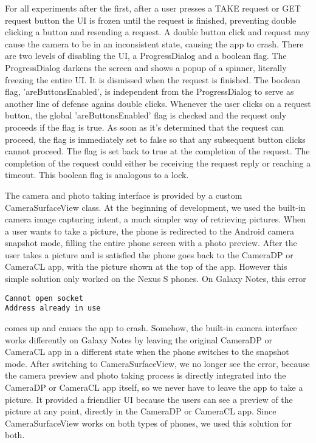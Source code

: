 For all experiments after the first, after a user presses a TAKE request or GET request button the UI is frozen until the request is finished, preventing double clicking a button and resending a request. A double button click and request may cause the camera to be in an inconsistent state, causing the app to crash. There are two levels of disabling the UI, a ProgressDialog and a boolean flag. The ProgressDialog darkens the screen and shows a popup of a spinner, literally freezing the entire UI. It is dismissed when the request is finished. The boolean flag, 'areButtonsEnabled', is independent from the ProgressDialog to serve as another line of defense agains double clicks. Whenever the user clicks on a request button, the global 'areButtonsEnabled' flag is checked and the request only proceeds if the flag is true. As soon as it's determined that the request can proceed, the flag is immediately set to false so that any subsequent button clicks cannot proceed. The flag is set back to true at the completion of the request. The completion of the request could either be receiving the request reply or reaching a timeout. This boolean flag is analogous to a lock.

The camera and photo taking interface is provided by a custom CameraSurfaceView class. At the beginning of development, we used the built-in camera image capturing intent, a much simpler way of retrieving pictures. When a user wants to take a picture, the phone is redirected to the Android camera snapshot mode, filling the entire phone screen with a photo preview. After the user takes a picture and is satisfied the phone goes back to the CameraDP or CameraCL app, with the picture shown at the top of the app. However this simple solution only worked on the Nexus S phones. On Galaxy Notes, this error
\begin{verbatim}
Cannot open socket
Address already in use
\end{verbatim}
comes up and causes the app to crash. Somehow, the built-in camera interface works differently on Galaxy Notes by leaving the original CameraDP or CameraCL app in a different state when the phone switches to the snapshot mode. After switching to CameraSurfaceView, we no longer see the error, because the camera preview and photo taking process is directly integrated into the CameraDP or CameraCL app itself, so we never have to leave the app to take a picture. It provided a friendlier UI because the users can see a preview of the picture at any point, directly in the CameraDP or CameraCL app. Since CameraSurfaceView works on both types of phones, we used this solution for both.

